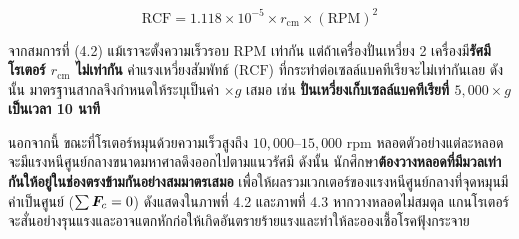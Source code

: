 \begin{equation}
    \text{RCF} = 1.118 \times 10^{-5} \times r_{\text{cm}} \times (\text{RPM})^2
\end{equation}

\begin{conceptbox}
จากสมการที่ (4.2) แม้เราจะตั้งความเร็วรอบ $\text{RPM}$ เท่ากัน แต่ถ้าเครื่องปั่นเหวี่ยง 2 เครื่องมี\textbf{รัศมีโรเตอร์ $r_{\text{cm}}$ ไม่เท่ากัน} ค่าแรงเหวี่ยงสัมพัทธ์ ($\text{RCF}$) ที่กระทำต่อเซลล์แบคทีเรียจะไม่เท่ากันเลย ดังนั้น มาตรฐานสากลจึงกำหนดให้ระบุเป็นค่า $\times g$ เสมอ เช่น \textbf{ปั่นเหวี่ยงเก็บเซลล์แบคทีเรียที่ $5{,}000 \times g$ เป็นเวลา 10 นาที}
\end{conceptbox}

นอกจากนี้ ขณะที่โรเตอร์หมุนด้วยความเร็วสูงถึง $10{,}000\text{--}15{,}000\text{ rpm}$ หลอดตัวอย่างแต่ละหลอดจะมีแรงหนีศูนย์กลางขนาดมหาศาลดึงออกไปตามแนวรัศมี ดังนั้น นักศึกษา\textbf{ต้องวางหลอดที่มีมวลเท่ากันให้อยู่ในช่องตรงข้ามกันอย่างสมมาตรเสมอ} เพื่อให้ผลรวมเวกเตอร์ของแรงหนีศูนย์กลางที่จุดหมุนมีค่าเป็นศูนย์ ($\sum \bm{F}_c = 0$) ดังแสดงใน\mbox{ภาพที่} 4.2 และ\mbox{ภาพที่} 4.3 หากวางหลอดไม่สมดุล แกนโรเตอร์จะสั่นอย่างรุนแรงและอาจแตกหักก่อให้เกิดอันตรายร้ายแรงและทำให้ละอองเชื้อโรคฟุ้งกระจาย

